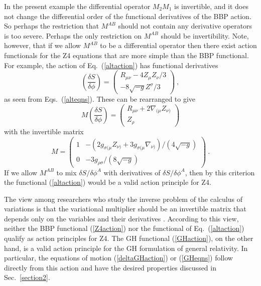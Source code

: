 \documentclass[letterpaper,nofootinbib,prd,amsmath,twocolumn]{revtex4-1}
\begin{document}
In the present example the differential operator $M_2 M_1$ is invertible, and it does not change the 
differential order of the functional derivatives of the BBP action. 
So perhaps the restriction that $M^{AB}$ should not contain any derivative operators
is too severe. Perhaps the only restriction on $M^{AB}$ should be invertibility. Note, however, that 
if we allow $M^{AB}$ to be a differential operator then there exist action functionals for 
the Z4 equations that are more simple than the BBP functional. For example, 
the action of Eq.~(\ref{altaction}) has functional derivatives
\begin{equation}
      \left( \frac{\delta S}{\delta\phi}\right)  = \left( \begin{array}{c} 
      R_{\mu\nu} - 4 Z_\mu Z_\nu/3 \\
      -8\sqrt{-g} Z^\sigma /3 \end{array} \right) \ ,
\end{equation}
as seen from Eqs.~(\ref{alteqns}). These can be rearranged to give 
\begin{equation}
      M\left( \frac{\delta S}{\delta \phi} \right) = \left( \begin{array}{c} 
      R_{\mu\nu} + 2\nabla_{(\mu} Z_{\nu)} \\
       Z_\rho \end{array} \right) 
\end{equation}
with the invertible matrix 
\begin{equation}
      M = \left( \begin{array}{cc} 1 & -( 2g_{\sigma(\mu}Z_{\nu)} + 3 g_{\sigma(\mu}\nabla_{\nu)} )/(4\sqrt{-g}) \\
      0 & -3g_{\rho\sigma}/(8\sqrt{-g}) \end{array} \right) \ .
\end{equation}
If we allow $M^{AB}$ to mix  $\delta S/\delta\phi^A$ with derivatives of  $\delta S/\delta\phi^A$, 
then by this criterion the functional (\ref{altaction}) would be a valid action principle for Z4. 

The view among researchers who study the inverse problem of the calculus 
of variations is that the variational multiplier should be an invertible matrix that depends only 
on the variables and their derivatives \cite{AndersonThompson}. According to this view, neither the BBP functional 
(\ref{Z4action}) nor the functional of Eq.~(\ref{altaction}) qualify as action principles for Z4. 
The GH functional (\ref{GHaction}), on the other hand, is a valid 
action principle for the GH formulation of general relativity. In particular, the equations 
of motion (\ref{deltaGHaction}) or (\ref{GHeqns}) follow directly from this action and have the 
desired properties discussed in Sec.~\ref{section2}. 



\end{document}
